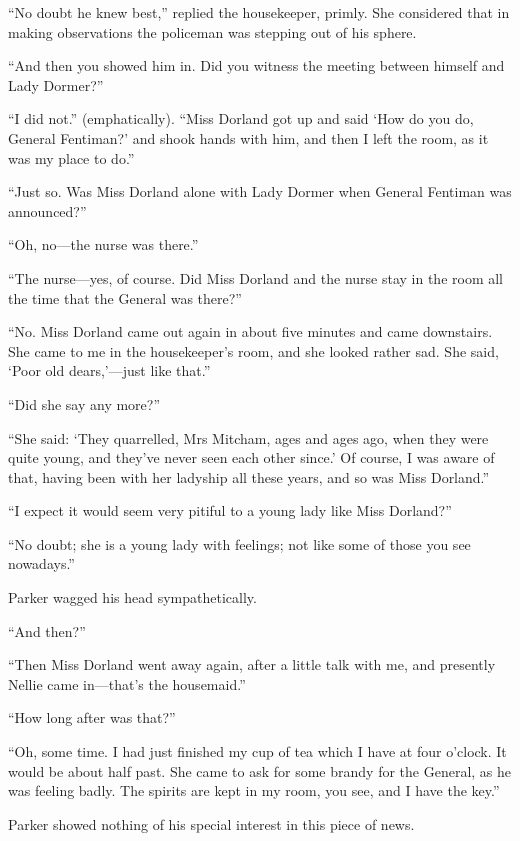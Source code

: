 \enquote{No doubt he knew best,} replied the housekeeper, primly. She considered that in making observations the policeman was stepping out of his sphere.

\enquote{And then you showed him in. Did you witness the meeting between himself and Lady Dormer?}

\enquote{I did not.} (emphatically). \enquote{Miss Dorland got up and said \enquote{How do you do, General Fentiman?} and shook hands with him, and then I left the room, as it was my place to do.}

\enquote{Just so. Was Miss Dorland alone with Lady Dormer when General Fentiman was announced?}

\enquote{Oh, no\allowbreak---\allowbreak the nurse was there.}

\enquote{The nurse\allowbreak---\allowbreak yes, of course. Did Miss Dorland and the nurse stay in the room all the time that the General was there?}

\enquote{No. Miss Dorland came out again in about five minutes and came downstairs. She came to me in the housekeeper's room, and she looked rather sad. She said, \enquote{Poor old dears,}---just like that.}

\enquote{Did she say any more?}

\enquote{She said: \enquote{They quarrelled, Mrs Mitcham, ages and ages ago, when they were quite young, and they've never seen each other since.} Of course, I was aware of that, having been with her ladyship all these years, and so was Miss Dorland.}

\enquote{I expect it would seem very pitiful to a young lady like Miss Dorland?}

\enquote{No doubt; she is a young lady with feelings; not like some of those you see nowadays.}

Parker wagged his head sympathetically.

\enquote{And then?}

\enquote{Then Miss Dorland went away again, after a little talk with me, and presently Nellie came in\allowbreak---\allowbreak that's the housemaid.}

\enquote{How long after was that?}

\enquote{Oh, some time. I had just finished my cup of tea which I have at four o'clock. It would be about half past. She came to ask for some brandy for the General, as he was feeling badly. The spirits are kept in my room, you see, and I have the key.}

Parker showed nothing of his special interest in this piece of news.

